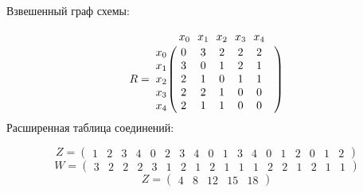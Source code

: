 \documentclass{article}
\begin{document}
Взвешенный граф схемы:
\begin{figure}[h!]
\end{figure}
$$
R =
\bordermatrix{ & x_{0} \!&\! x_{1} \!&\! x_{2} \!&\! x_{3} \!&\! x_{4} \!&\! \cr 
x_{0} \!&\! 0 \!&\! 3 \!&\! 2 \!&\! 2 \!&\! 2 \!&\! \cr
x_{1} \!&\! 3 \!&\! 0 \!&\! 1 \!&\! 2 \!&\! 1 \!&\! \cr
x_{2} \!&\! 2 \!&\! 1 \!&\! 0 \!&\! 1 \!&\! 1 \!&\! \cr
x_{3} \!&\! 2 \!&\! 2 \!&\! 1 \!&\! 0 \!&\! 0 \!&\! \cr
x_{4} \!&\! 2 \!&\! 1 \!&\! 1 \!&\! 0 \!&\! 0 \!&\! \cr
}$$
Расширенная таблица соединений:

$$
 Z =\left(
\begin{array}{cccccccccccccccccc}
1 \!&\! 2 \!&\! 3 \!&\! 4 \!&\! 0 \!&\! 2 \!&\! 3 \!&\! 4 \!&\! 0 \!&\! 1 \!&\! 3 \!&\! 4 \!&\! 0 \!&\! 1 \!&\! 2 \!&\! 0 \!&\! 1 \!&\! 2 
\end{array}
\right)$$
$$
 W =\left(
\begin{array}{cccccccccccccccccc}
3 \!&\! 2 \!&\! 2 \!&\! 2 \!&\! 3 \!&\! 1 \!&\! 2 \!&\! 1 \!&\! 2 \!&\! 1 \!&\! 1 \!&\! 1 \!&\! 2 \!&\! 2 \!&\! 1 \!&\! 2 \!&\! 1 \!&\! 1 
\end{array}
\right)$$
$$
 Z =\left(
\begin{array}{ccccc}
4 \!&\! 8 \!&\! 12 \!&\! 15 \!&\! 18 
\end{array}
\right)$$
\end{document}
